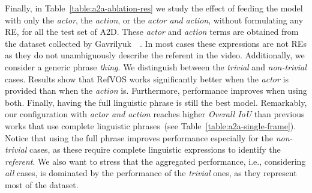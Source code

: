 \documentclass[10pt,twocolumn,letterpaper]{article}
\begin{document}
\begin{table}[]
\centering
{}
\caption{\textit{Overall} and \textit{Mean IoU} on A2D for different levels of information in REs.}
\label{table:a2a-ablation-res}
\end{table}






Finally, in Table~\ref{table:a2a-ablation-res} we study the effect of feeding the model with only the \textit{actor}, the \textit{action}, or the \textit{actor and action}, without formulating any RE, for all the test set of A2D.
These \textit{actor} and \textit{action} terms are obtained from 
the dataset collected by Gavrilyuk~\etal~\cite{gavrilyuk2018actor}. 
In most cases these expressions are not REs as they do not unambiguously describe the referent in the video.
Additionally, we consider a generic phrase \textit{thing}. We distinguish between the \textit{trivial} and \textit{non-trivial} cases.
Results show that RefVOS works significantly better when the \textit{actor} is provided than when the \textit{action} is. Furthermore, performance improves when using both. Finally, having the full linguistic phrase is still the best model. Remarkably, our configuration with \textit{actor and action} reaches higher \textit{Overall IoU} than previous works that use complete linguistic phrases~(see Table~\ref{table:a2a-single-frame}). 
Notice that using the full phrase improves performance especially for the \textit{non-trivial} cases, as these require complete linguistic expressions to identify the \textit{referent}. We also want to stress that the aggregated performance, i.e., considering \textit{all} cases, is dominated by the performance of the \textit{trivial} ones, as they represent most of the dataset.  
\end{document}
